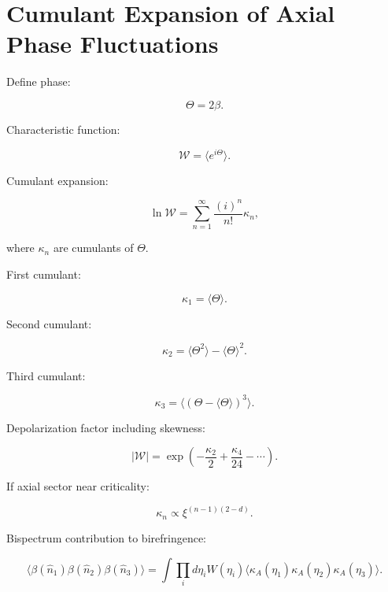 \documentclass[12pt]{article}
\begin{document}
\section{Cumulant Expansion of Axial Phase Fluctuations}

Define phase:

\begin{equation}
\Theta
=
2\beta.
\end{equation}

Characteristic function:

\begin{equation}
\mathcal{W}
=
\langle e^{i\Theta} \rangle.
\end{equation}

Cumulant expansion:

\begin{equation}
\ln \mathcal{W}
=
\sum_{n=1}^{\infty}
\frac{(i)^n}{n!}
\kappa_n,
\end{equation}

where $\kappa_n$ are cumulants of $\Theta$.

First cumulant:

\begin{equation}
\kappa_1 = \langle \Theta \rangle.
\end{equation}

Second cumulant:

\begin{equation}
\kappa_2 = \langle \Theta^2 \rangle - \langle \Theta \rangle^2.
\end{equation}

Third cumulant:

\begin{equation}
\kappa_3
=
\langle (\Theta-\langle\Theta\rangle)^3 \rangle.
\end{equation}

Depolarization factor including skewness:

\begin{equation}
|\mathcal{W}|
=
\exp
\left(
-\frac{\kappa_2}{2}
+
\frac{\kappa_4}{24}
-
\cdots
\right).
\end{equation}

If axial sector near criticality:

\begin{equation}
\kappa_n
\propto
\xi^{(n-1)(2-d)}.
\end{equation}

Bispectrum contribution to birefringence:

\begin{equation}
\langle
\beta(\hat n_1)
\beta(\hat n_2)
\beta(\hat n_3)
\rangle
=
\int
\prod_i d\eta_i
W(\eta_i)
\langle
\kappa_A(\eta_1)
\kappa_A(\eta_2)
\kappa_A(\eta_3)
\rangle.
\end{equation}
\end{document}

